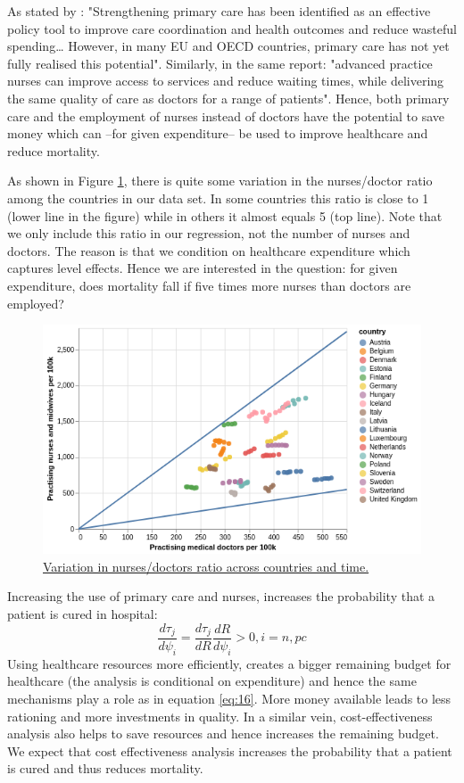 \documentclass[12pt,english,a4paper]{article}
\begin{document}
As stated by \cite{OECD_2020}: "Strengthening primary care has been identified as an effective policy tool to improve care coordination and health outcomes and reduce wasteful spending\ldots{} However, in many EU and OECD countries, primary care has not yet fully realised this potential". Similarly, in the same report: "advanced practice nurses can improve access to services and reduce waiting times, while delivering the same quality of care as doctors for a range of patients". Hence, both primary care and the employment of nurses instead of doctors have the potential to save money which can --for given expenditure-- be used to improve healthcare and reduce mortality.

As shown in Figure \ref{fig:org00ab120}, there is quite some variation in the nurses/doctor ratio among the countries in our data set. In some countries this ratio is close to 1 (lower line in the figure) while in others it almost equals 5 (top line). Note that we only include this ratio in our regression, not the number of nurses and doctors. The reason is that we condition on healthcare expenditure which captures level effects. Hence we are interested in the question: for given expenditure, does mortality fall if five times more nurses than doctors are employed?

\begin{figure}[htbp]
\centering
\includegraphics[width=.9\linewidth]{./figures/doctors_nurses.png}
\caption{\label{fig:org00ab120}\href{https://janboone.github.io/European-Healthcare-Systems/figures/doctors\_nurses.html}{Variation in nurses/doctors ratio across countries and time.}}
\end{figure}

Increasing the use of primary care and nurses, increases the probability that a patient is cured in hospital:
\begin{equation}
\label{eq:15}
\frac{d\tau_j}{d \psi_i} = \frac{d\tau_j}{dR} \frac{dR}{d \psi_i} > 0, i = n, pc
\end{equation}
Using healthcare resources more efficiently, creates a bigger remaining budget for healthcare (the analysis is conditional on expenditure) and hence the same mechanisms play a role as in equation \eqref{eq:16}. More money available leads to less rationing and more investments in quality. In a similar vein, cost-effectiveness analysis also helps to save resources and hence increases the remaining budget. We expect that cost effectiveness analysis increases the probability that a patient is cured and thus reduces mortality.
\end{document}
